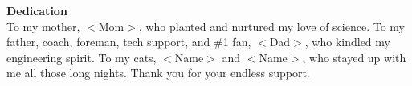 \hspace{0pt}\vfill
{\centering\large\textbf{Dedication}\\
\normalsize\vspace{\baselineskip}
 To my mother, $<$Mom$>$, who planted and nurtured my love of science. To my father, coach, foreman, tech support, and \#1 fan, $<$Dad$>$, who kindled my engineering spirit. To my cats, $<$Name$>$ and $<$Name$>$, who stayed up with me all those long nights. Thank you for your endless support.\par
 }
\vfill\hspace{0pt}
